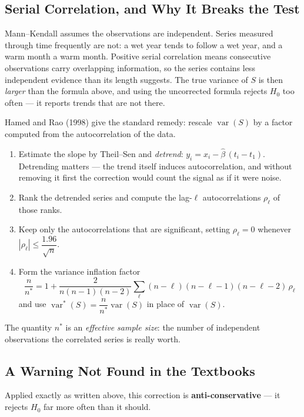 \documentclass[11pt,a4paper]{article}
\theoremstyle{definition}
\begin{document}
\subsection{Serial Correlation, and Why It Breaks the Test}

Mann--Kendall assumes the observations are independent. Series measured through
time frequently are not: a wet year tends to follow a wet year, and a warm month
a warm month. Positive serial correlation means consecutive observations carry
overlapping information, so the series contains less independent evidence than
its length suggests. The true variance of $S$ is then \emph{larger} than the
formula above, and using the uncorrected formula rejects $H_0$ too often --- it
reports trends that are not there.

Hamed and Rao (1998) give the standard remedy: rescale $\operatorname{var}(S)$ by
a factor computed from the autocorrelation of the data.

\begin{enumerate}
\item[(i).] Estimate the slope by Theil--Sen and \emph{detrend}:
$y_i = x_i - \widehat{\beta}\,(t_i - t_1)$. Detrending matters --- the trend
itself induces autocorrelation, and without removing it first the correction
would count the signal as if it were noise.
\item[(ii).] Rank the detrended series and compute the lag-$\ell$
autocorrelations $\rho_\ell$ of those ranks.
\item[(iii).] Keep only the autocorrelations that are significant, setting
$\rho_\ell = 0$ whenever
$\left|\rho_\ell\right| \leq \dfrac{1.96}{\sqrt{n}}$.
\item[(iv).] Form the variance inflation factor
$$\dfrac{n}{n^{*}} = 1 + \dfrac{2}{n(n-1)(n-2)}
\sum_{\ell} (n - \ell)(n - \ell - 1)(n - \ell - 2)\,\rho_\ell$$
and use $\operatorname{var}^{*}(S) = \dfrac{n}{n^{*}}\operatorname{var}(S)$ in
place of $\operatorname{var}(S)$.
\end{enumerate}

The quantity $n^{*}$ is an \emph{effective sample size}: the number of
independent observations the correlated series is really worth.

\subsection{A Warning Not Found in the Textbooks}

Applied exactly as written above, this correction is
\textbf{anti-conservative} --- it rejects $H_0$ far more often than it should.
\end{document}
